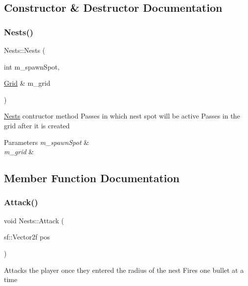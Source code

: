\subsection{Constructor \& Destructor Documentation}
\mbox{\label{class_nests_ae9e040d5e6f53f7390fa25a909db6cf4}} 
\subsubsection{\texorpdfstring{Nests()}{Nests()}}
{\footnotesize\ttfamily Nests\+::\+Nests (\begin{DoxyParamCaption}\item[{int}]{m\+\_\+spawn\+Spot,  }\item[{\mbox{\hyperlink{class_grid}{Grid}} \&}]{m\+\_\+grid }\end{DoxyParamCaption})}



\mbox{\hyperlink{class_nests}{Nests}} contructor method Passes in which nest spot will be active Passes in the grid after it is created 


\begin{DoxyParams}{Parameters}
{\em m\+\_\+spawn\+Spot} & \\
\hline
{\em m\+\_\+grid} & \\
\hline
\end{DoxyParams}


\subsection{Member Function Documentation}
\mbox{\label{class_nests_a288c3f8242ce492434df30d8204c10ca}} 
\subsubsection{\texorpdfstring{Attack()}{Attack()}}
{\footnotesize\ttfamily void Nests\+::\+Attack (\begin{DoxyParamCaption}\item[{sf\+::\+Vector2f}]{pos }\end{DoxyParamCaption})\hspace{0.3cm}{\ttfamily [private]}}



Attacks the player once they entered the radius of the nest Fires one bullet at a time 


